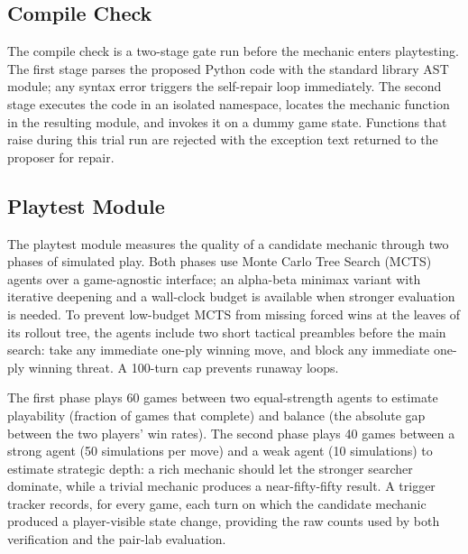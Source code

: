 \documentclass[conference]{IEEEtran}
\begin{document}
\subsection{Compile Check}                                                    
                                                                              
  The compile check is a two-stage gate run before the mechanic enters          
  playtesting. The first stage parses the proposed Python code with the standard
   library AST module; any syntax error triggers the self-repair loop           
  immediately. The second stage executes the code in an isolated namespace,   
  locates the mechanic function in the resulting module, and invokes it on a
  dummy game state. Functions that raise during this trial run are rejected with
   the exception text returned to the proposer for repair.

 \subsection{Playtest Module}                                                  
                                                                              
  The playtest module measures the quality of a candidate mechanic through two  
  phases of simulated play. Both phases use Monte Carlo Tree Search (MCTS)    
  agents over a game-agnostic interface; an alpha-beta minimax variant with     
  iterative deepening and a wall-clock budget is available when stronger      
  evaluation is needed. To prevent low-budget MCTS from missing forced wins at
  the leaves of its rollout tree, the agents include two short tactical
  preambles before the main search: take any immediate one-ply winning move, and
   block any immediate one-ply winning threat. A 100-turn cap prevents runaway
  loops.                                                                        
   
  The first phase plays 60 games between two equal-strength agents to estimate  
  playability (fraction of games that complete) and balance (the absolute gap 
  between the two players' win rates). The second phase plays 40 games between a
   strong agent (50 simulations per move) and a weak agent (10 simulations) to
  estimate strategic depth: a rich mechanic should let the stronger searcher
  dominate, while a trivial mechanic produces a near-fifty-fifty result. A
  trigger tracker records, for every game, each turn on which the candidate
  mechanic produced a player-visible state change, providing the raw counts used
   by both verification and the pair-lab evaluation.   
\end{document}

